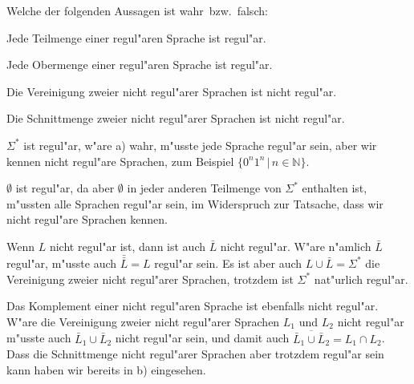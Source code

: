 Welche der folgenden Aussagen ist wahr~bzw.~falsch:
\begin{teilaufgaben}
\item Jede Teilmenge einer regul"aren Sprache ist regul"ar.
\item Jede Obermenge einer regul"aren Sprache ist regul"ar.
\item Die Vereinigung zweier nicht regul"arer Sprachen ist nicht regul"ar.
\item Die Schnittmenge zweier nicht regul"arer Sprachen ist nicht
regul"ar.
\end{teilaufgaben}

\begin{loesung}
\begin{teilaufgaben}
\item $\Sigma^*$ ist regul"ar, w"are a) wahr, m"usste jede Sprache regul"ar
sein, aber wir kennen nicht regul"are Sprachen, zum Beispiel
$\{0^n1^n\,|\,n\in\mathbb N\}$.
\item $\emptyset$ ist regul"ar, da aber $\emptyset$ in jeder anderen
Teilmenge von $\Sigma^*$ enthalten ist, m"ussten alle Sprachen regul"ar
sein, im Widerspruch zur Tatsache, dass wir nicht regul"are Sprachen
kennen.
\item Wenn $L$ nicht regul"ar ist, dann ist auch $\bar L$ nicht regul"ar.
W"are n"amlich $\bar L$ regul"ar, m"usste auch $\bar{\bar L}=L$ regul"ar
sein. Es ist aber auch $L\cup \bar L=\Sigma^*$ die Vereinigung zweier
nicht regul"arer Sprachen, trotzdem ist $\Sigma^*$ nat"urlich regul"ar.
\item Das Komplement einer nicht regul"aren Sprache ist ebenfalls nicht
regul"ar. W"are die Vereinigung zweier nicht regul"arer Sprachen $L_1$
und $L_2$ nicht regul"ar m"usste auch $\bar L_1\cup \bar L_2$ nicht
regul"ar sein, und damit auch $\overline{\bar L_1\cup \bar L_2}=L_1\cap L_2$.
Dass die Schnittmenge nicht regul"arer Sprachen aber trotzdem regul"ar
sein kann haben wir bereits in b) eingesehen.
\qedhere
\end{teilaufgaben}
\end{loesung}

